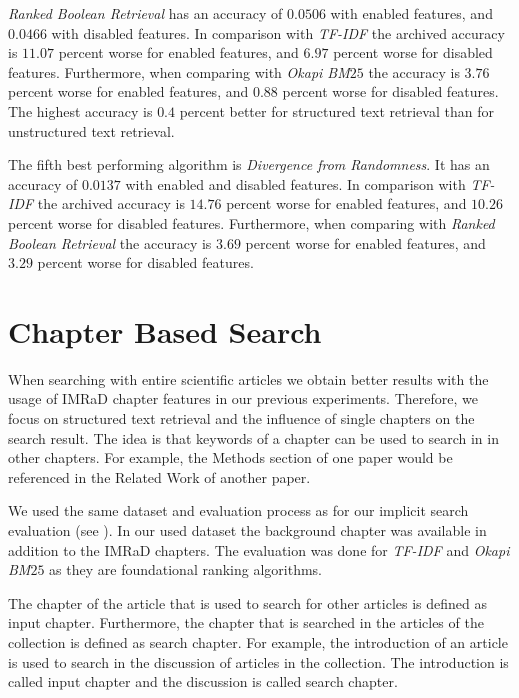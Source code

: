 \textit{Ranked Boolean Retrieval} has an accuracy of $0.0506$ with enabled features, and $0.0466$ with disabled features. In comparison with \textit{TF-IDF} the archived accuracy is $11.07$ percent worse for enabled features, and $6.97$ percent worse for disabled features. Furthermore, when comparing with \textit{Okapi BM$25$} the accuracy is $3.76$ percent worse for enabled features, and $0.88$ percent worse for disabled features. The highest accuracy is $0.4$ percent better for structured text retrieval than for unstructured text retrieval.

The fifth best performing algorithm is \textit{Divergence from Randomness}. It has an accuracy of $0.0137$ with enabled and disabled features. In comparison with \textit{TF-IDF} the archived accuracy is $14.76$ percent worse for enabled features, and $10.26$ percent worse for disabled features. Furthermore, when comparing with \textit{Ranked Boolean Retrieval} the accuracy is $3.69$ percent worse for enabled features, and $3.29$ percent worse for disabled features. 

\section{Chapter Based Search}

When searching with entire scientific articles we obtain better results with the usage of IMRaD chapter features in our previous experiments. Therefore, we focus on structured text retrieval and the influence of single chapters on the search result. The idea is that keywords of a chapter can be used to search in in other chapters. For example, the Methods section of one paper would be referenced in the Related Work of another paper.

We used the same dataset and evaluation process as for our implicit search evaluation (see ). In our used dataset the background chapter was available in addition to the IMRaD chapters. The evaluation was done for \textit{TF-IDF} and \textit{Okapi BM$25$} as they are foundational ranking algorithms.

The chapter of the article that is used to search for other articles is defined as input chapter. Furthermore, the chapter that is searched in the articles of the collection is defined as search chapter. For example, the introduction of an article is used to search in the discussion of articles in the collection. The introduction is called input chapter and the discussion is called search chapter.  

